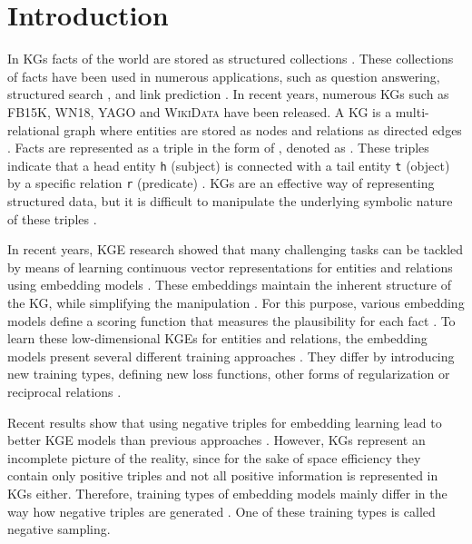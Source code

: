 \chapter{Introduction}
\label{ch:introduction}

In \acp{KG} facts of the world are stored as structured collections \cite{hogan2020knowledge}.
These collections of facts have been used in numerous applications, such as question answering, structured search \cite{zhang2019nscaching}, and link prediction \cite{cai2017kbgan, Alam2020AffinityDN}.
In recent years, numerous \acp{KG} such as \textsc{FB15K}, \textsc{WN18}, \textsc{YAGO} \cite{ConEx} and \textsc{WikiData} \cite{arnaoutwikinegata} have been released.
A \ac{KG} is a multi-relational graph where entities are stored as nodes and relations as directed edges \cite{zhang2019nscaching}.
Facts are represented as a triple in the form of , denoted as .
These triples indicate that a head entity \texttt{h} (subject) is connected with a tail entity \texttt{t} (object) by a specific relation \texttt{r} (predicate) \cite{zhang2019nscaching, Alam2020AffinityDN}.
\acp{KG} are an effective way of representing structured data, but it is difficult to manipulate the underlying symbolic nature of these triples \cite{8047276}.

In recent years, \ac{KGE} research showed that many challenging tasks can be tackled by means of learning continuous vector representations for entities and relations using embedding models \cite{Alam2020AffinityDN}.
These embeddings maintain the inherent structure of the \ac{KG}, while simplifying the manipulation \cite{8047276}. 
For this purpose, various embedding models define a scoring function that measures the plausibility for each fact \cite{8047276, ConvE, qiannegative}.
To learn these low-dimensional \acp{KGE} for entities and relations, the embedding models present several different training approaches \cite{Ruffinelli2020You}.
They differ by introducing new training types, defining new loss functions, other forms of regularization or reciprocal relations \cite{Ruffinelli2020You}.

Recent results show that using negative triples for embedding learning lead to better \ac{KGE} models than previous approaches \cite{kotnis2017analysis}.
However, \acp{KG} represent an incomplete picture of the reality, since for the sake of space efficiency they contain only positive triples \cite{qiannegative} and not all positive information is represented in \acp{KG} either.
Therefore, training types of embedding models mainly differ in the way how negative triples are generated \cite{Ruffinelli2020You}. 
One of these training types is called negative sampling.
\clearpage

%

%

%

%
